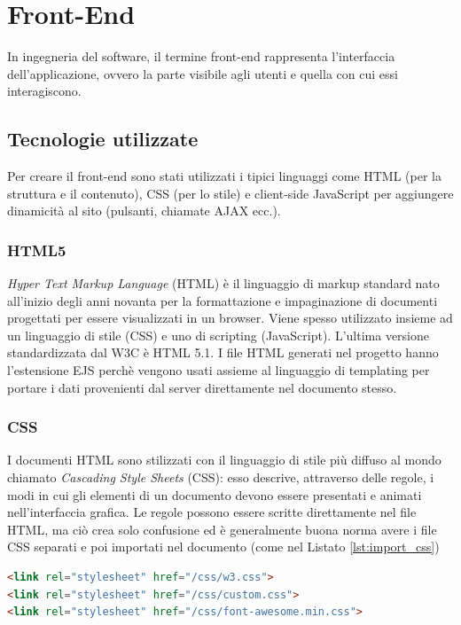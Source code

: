\documentclass[12pt]{report}
\begin{document}
%
\section{Front-End}
%

In ingegneria del software, il termine front-end rappresenta l'interfaccia dell'applicazione, ovvero la parte visibile agli utenti e quella con cui essi interagiscono.

%
\subsection{Tecnologie utilizzate}
%

Per creare il front-end sono stati utilizzati i tipici linguaggi come HTML (per la struttura e il contenuto), CSS (per lo stile) e client-side JavaScript per aggiungere dinamicità al sito (pulsanti, chiamate AJAX ecc.).

%
\subsubsection*{HTML5}
%
\emph{Hyper Text Markup Language} (HTML) è il linguaggio di markup standard nato all'inizio degli anni novanta per la formattazione e impaginazione di documenti progettati per essere visualizzati in un browser. Viene spesso utilizzato insieme ad un linguaggio di stile (CSS) e uno di scripting (JavaScript). L'ultima versione standardizzata dal W3C è HTML 5.1.
I file HTML generati nel progetto hanno l'estensione EJS perchè vengono usati assieme al linguaggio di templating per portare i dati provenienti dal server direttamente nel documento stesso.
%
\subsubsection*{CSS}
%
I documenti HTML sono stilizzati con il linguaggio di stile più diffuso al mondo chiamato \emph{Cascading Style Sheets} (CSS): esso descrive, attraverso delle regole, i modi in cui gli elementi di un documento devono essere presentati e animati nell'interfaccia grafica. Le regole possono essere scritte direttamente nel file HTML, ma ciò crea solo confusione ed è generalmente buona norma avere i file CSS separati e poi importati nel documento (come nel Listato \ref{lst:import_css})
\begin{lstlisting}[language=HTML, caption={Importazione dei file di stile nel documento HTML}, label={lst:import_css}]
<link rel="stylesheet" href="/css/w3.css">
<link rel="stylesheet" href="/css/custom.css">
<link rel="stylesheet" href="/css/font-awesome.min.css">
\end{lstlisting}
\end{document}
